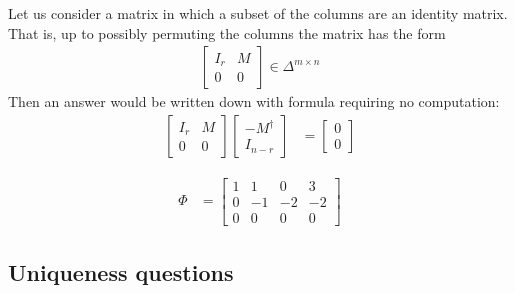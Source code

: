 \documentclass[12pt,twoside,dvipsnames,letterpaper]{memoir}
\begin{document}
Let us consider a matrix in which a subset of the columns 
are an identity matrix.  That is, up to possibly permuting 
the columns the matrix has the form
\begin{align*}
    \begin{bmatrix}
        I_r & M \\ 
        0 & 0 
    \end{bmatrix}\in \Delta^{m\times n}
\end{align*}
Then an answer would be written down with formula 
requiring no computation:
\begin{align*}
    \begin{bmatrix}
        I_r & M \\ 
        0 & 0 
    \end{bmatrix}
    \begin{bmatrix}
        -M^{\dagger}  \\ 
        I_{n-r} 
    \end{bmatrix}
    & = 
    \begin{bmatrix}
        0\\
        0
    \end{bmatrix}
\end{align*}


\begin{align*}
    \Phi & = 
    \begin{bmatrix}
        1 & 1 & 0 & 3\\
        0 & -1 & -2 & -2\\
        0 & 0 & 0 & 0
    \end{bmatrix}
\end{align*}





\subsection{Uniqueness questions}
\end{document}
